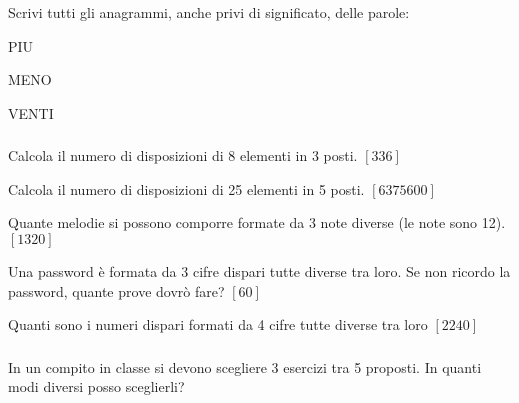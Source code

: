 \begin{esercizio}\label{P.3}
Scrivi tutti gli anagrammi, anche privi di significato, delle parole:
\begin{multicols}{3}
 \begin{enumeratea}
  \item PIU
  \item MENO
  \item VENTI
 \end{enumeratea}
 \end{multicols}
\end{esercizio}

\subsubsection*{}

\begin{esercizio}\label{D.1}
Calcola il numero di disposizioni di 8 elementi in 3 posti.
\hfill $\left[336\right]$
\end{esercizio}

\begin{esercizio}\label{D.2}
Calcola il numero di disposizioni di 25 elementi in 5 posti.
\hfill $\left[6375600\right]$
\end{esercizio}

\begin{esercizio}\label{D.3}
Quante melodie si possono comporre formate da 3 note diverse (le note sono 12).
\hfill $\left[1320\right]$
\end{esercizio}

\begin{esercizio}\label{D.4}
Una password è formata da 3 cifre dispari tutte diverse tra loro. Se non ricordo la password, quante prove dovrò fare?
\hfill $\left[60\right]$
\end{esercizio}

\begin{esercizio}\label{D.5}
Quanti sono i numeri dispari formati da 4 cifre tutte diverse tra loro
\hfill $\left[2240\right]$
\end{esercizio}

\subsubsection*{}

\begin{esercizio}
\label{ese:C.1}
In un compito in classe si devono scegliere 3 esercizi tra 5 proposti. In quanti modi diversi posso sceglierli?
\end{esercizio}

